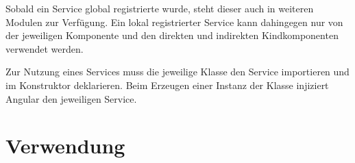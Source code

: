 Sobald ein Service global registrierte wurde, steht dieser auch in weiteren Modulen zur Verfügung. Ein lokal registrierter Service kann dahingegen nur von der jeweiligen Komponente und den direkten und indirekten Kindkomponenten verwendet werden. 

Zur Nutzung eines Services muss die jeweilige Klasse den Service importieren und im Konstruktor deklarieren. Beim Erzeugen einer Instanz der Klasse injiziert Angular den jeweiligen Service.\autocites[vgl.][92\psqq]{Steyer.2017}[vgl.][474\psqq]{Freeman.2018}


\section{Verwendung}    